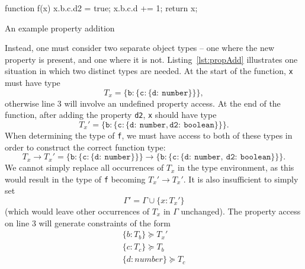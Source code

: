 \documentclass[12pt,a4paper,twoside,openright]{report}
\theoremstyle{definition}
\theoremstyle{dotless}
\newcommand*{\js}{\texttt}
\begin{document}
\begin{listing}[t]
  \centering
  \begin{minipage}[b]{0.45\linewidth}
 	\begin{jscript}
	  function f(x) {
	 	x.b.c.d2 = true;
	 	x.b.c.d += 1;
	 	return x;
	  }	
 	\end{jscript}
 	\vspace{23mm}
  \end{minipage}
  \quad
  \begin{minipage}[b]{0.45\linewidth}
  \end{minipage}
  \caption{An example property addition}\label{lst:propAdd}
\end{listing}
Instead, one must consider two separate object types -- one where the new
property is present, and one where it is not. Listing~\ref{lst:propAdd}
illustrates one situation in which two distinct types are needed. At the start
of the function, \js{x} must have type 
$$T_x = \mathtt{\{b:\{c:\{d:\ number\}\}\}},$$
otherwise line 3 will involve an undefined property access. At the end of the
function, after adding the property \js{d2}, \js{x} should have type 
$$T_x' = \mathtt{\{b:\{c:\{d:\ number, d2:\ boolean\}\}\}}.$$
When determining the type
of \js{f}, we must have access to both of these types in order to construct the
correct function type: 
$$
T_x \rightarrow T_x' =
\mathtt{\{b:\{c:\{d:\ number\}\}\} \rightarrow
  \{b:\{c:\{d:\ number,\ d2:\ boolean\}\}\}}.
$$
We cannot simply replace all occurrences of $T_x$ in the type
environment, as this would result in the type of \js{f} becoming
$T_x'\rightarrow T_x'$. It is also insufficient to simply set $$\Gamma'=\Gamma\cup\{x:T_x'\}$$ (which would leave other occurrences of $T_x$ in $\Gamma$
unchanged).  The property access on line 3 will generate constraints of the
form 
\begin{equation}
  \begin{split}
 	\label{eq:barC}
 	\{b:T_b\} \succeq T_x' \\
 	\{c:T_c\} \succeq T_b \\
 	\{d:number\} \succeq T_c \\
  \end{split}
\end{equation}
\end{document}
